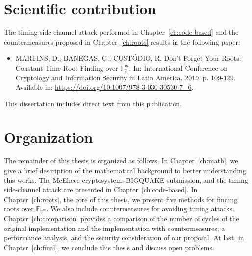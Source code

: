 \section{Scientific contribution}
The timing side-channel attack performed in Chapter~\ref{ch:code-based} and the countermeasures proposed in Chapter~\ref{ch:roots} results in the following paper:

\begin{itemize}
    \item  MARTINS, D.; BANEGAS, G.; CUSTÓDIO, R. Don’t Forget Your Roots: Constant-Time Root Finding over $\mathbb{F}_2^m$. In: International Conference on Cryptology and Information Security in Latin America.  2019. p. 109-129. Available in: \url{https://doi.org/10.1007/978-3-030-30530-7_6}.
\end{itemize}

This dissertation includes direct text from this publication.

\section{Organization}
The remainder of this thesis is organized as follows. In Chapter~\ref{ch:math}, we give a brief description of the mathematical background to better understanding this works. The McEliece cryptosystem, BIGQUAKE submission, and the timing side-channel attack are presented in Chapter~\ref{ch:code-based}. In Chapter~\ref{ch:roots}, the core of this thesis, we present five methods for finding roots over $\mathbb{F}_{2^m}$. We also include countermeasures for avoiding timing attacks. Chapter~\ref{ch:comparison} provides a comparison of the number of cycles of the original implementation and the implementation with countermeasures, a performance analysis, and the security consideration of our proposal. At last, in Chapter~\ref{ch:final}, we conclude this thesis and discuss open problems.
